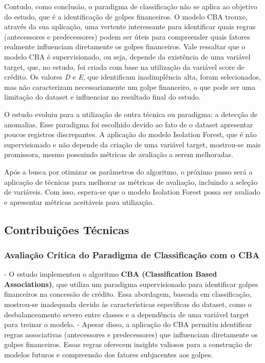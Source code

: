 \documentclass[12pt,a4paper]{article}
\begin{document}
Contudo, como conclus\~{a}o, o paradigma de classifica\c{c}\~{a}o n\~{a}o se aplica ao objetivo do estudo, que \'{e} a identifica\c{c}\~{a}o de golpes financeiros. O modelo CBA trouxe, atrav\'es da sua aplica\c{c}\~{a}o, uma vertente interessante para identificar quais regras (antecessores e predecessores) podem ser \'{u}teis para compreender quais fatores realmente influenciam diretamente os golpes financeiros. Vale ressaltar que o modelo CBA \'{e} supervisionado, ou seja, depende da exist\^{e}ncia de uma vari\'{a}vel target, que, no estudo, foi criada com base na utiliza\c{c}\~{a}o da vari\'{a}vel score de cr\'edito. Os valores \textit{D} e \textit{E}, que identificam inadimpl\^{e}ncia alta, foram selecionados, mas n\~{a}o caracterizam necessariamente um golpe financeiro, o que pode ser uma limita\c{c}\~{a}o do dataset e influenciar no resultado final do estudo.

O estudo evoluiu para a utiliza\c{c}\~{a}o de outra t\'ecnica ou paradigma: a detec\c{c}\~{a}o de anomalias. Esse paradigma foi escolhido devido ao fato de o dataset apresentar poucos registros discrepantes. A aplica\c{c}\~{a}o do modelo Isolation Forest, que \'{e} n\~{a}o supervisionado e n\~{a}o depende da cria\c{c}\~{a}o de uma vari\'{a}vel target, mostrou-se mais promissora, mesmo possuindo m\'etricas de avalia\c{c}\~{a}o a serem melhoradas. 

Ap\'os a busca por otimizar os par\^ametros do algoritmo, o pr\'{o}ximo passo ser\'{a} a aplica\c{c}\~{a}o de t\'ecnicas para melhorar as m\'etricas de avalia\c{c}\~{a}o, incluindo a sele\c{c}\~{a}o de vari\'{a}veis. Com isso, espera-se que o modelo Isolation Forest possa ser avaliado e apresentar m\'etricas aceit\'aveis para utiliza\c{c}\~{a}o.

\subsection{Contribui\c{c}\~{o}es T\'ecnicas}
\subsubsection{Avalia\c{c}\~{a}o Cr\'itica do Paradigma de Classifica\c{c}\~{a}o com o CBA}
- O estudo implementou o algoritmo \textbf{CBA (Classification Based Associations)}, que utiliza um paradigma supervisionado para identificar golpes financeiros na concess\~{a}o de cr\'edito. Essa abordagem, baseada em classifica\c{c}\~{a}o, mostrou-se inadequada devido \`as caracter\'{\i}sticas espec\'{\i}ficas do dataset, como o desbalanceamento severo entre classes e a depend\^{e}ncia de uma vari\'{a}vel target para treinar o modelo.
- Apesar disso, a aplica\c{c}\~{a}o do CBA permitiu identificar regras associativas (antecessores e predecessores) que influenciam diretamente os golpes financeiros. Essas regras oferecem insights valiosos para a constru\c{c}\~{a}o de modelos futuros e compreens\~{a}o dos fatores subjacentes aos golpes.
\end{document}
